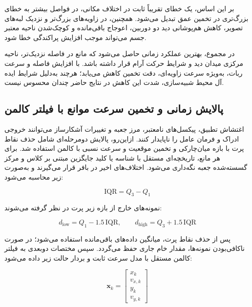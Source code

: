 بر این اساس، یک خطای تقریباً ثابت در اختلاف مکانی، در فواصل بیشتر به خطای بزرگ‌تری در تخمین عمق تبدیل می‌شود. همچنین، در زاویه‌های بزرگ‌تر و نزدیک لبه‌های تصویر، کاهش هم‌پوشانی دید دو دوربین، اعوجاج باقی‌مانده و کوچک‌شدن ناحیه معتبر جسم می‌تواند موجب افزایش پراکندگی خطا شود.

در مجموع، بهترین عملکرد زمانی حاصل می‌شود که مانع در فاصله نزدیک‌تر، ناحیه مرکزی میدان دید و شرایط حرکت آرام قرار داشته باشد. با افزایش فاصله و سرعت ربات، به‌ویژه سرعت زاویه‌ای، دقت تخمین کاهش می‌یابد؛ هرچند به‌دلیل شرایط ایده آل محیط شبیه‌سازی، شدت این کاهش در نتایج حاضر چندان محسوس نیست.


\subsection{پالایش زمانی و تخمین سرعت موانع با فیلتر کالمن}
\label{subsec:obstacle_kalman_velocity}

اغتشاش تطبیق، پیکسل‌های نامعتبر، مرز جعبه و تغییرات آشکارساز می‌توانند خروجی ادراک و فرمان عامل را ناپایدار کنند. ازاین‌رو، پالایش دومرحله‌ای شامل حذف نقاط پرت با بازه میان‌چارکی%
و تخمین موقعیت و سرعت نسبی با کالمن استفاده شد. برای هر مانع، تاریخچه‌ای مستقل با شناسه  یا کلید جایگزین مبتنی بر کلاس و مرکز گسسته‌شده جعبه نگه‌داری می‌شود. اختلاف‌های اخیر در بافر قرار می‌گیرند و  به‌صورت زیر محاسبه می‌شود:

\begin{equation}
	\mathrm{IQR}=Q_3-Q_1
	\label{eq:iqr_definition}
\end{equation}

نمونه‌های خارج از بازه زیر پرت در نظر گرفته می‌شوند:

\begin{equation}
	d_{\mathrm{low}} = Q_1 - 1.5\,\mathrm{IQR},
	\qquad
	d_{\mathrm{high}} = Q_3 + 1.5\,\mathrm{IQR}
	\label{eq:iqr_bounds}
\end{equation}

پس از حذف نقاط پرت، میانگین داده‌های باقی‌مانده استفاده می‌شود؛ در صورت ناکافی‌بودن نمونه‌ها، مقدار خام جاری حفظ می‌گردد. سپس مختصات دوبعدی به فیلتر کالمن مستقل با مدل سرعت ثابت و بردار حالت زیر داده می‌شود:

\begin{equation}
	\mathbf{x}_k =
	\begin{bmatrix}
		x_k \\
		v_{x,k} \\
		y_k \\
		v_{y,k}
	\end{bmatrix}
	\label{eq:kalman_state_obstacle}
\end{equation}

